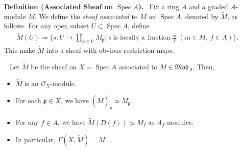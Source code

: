 \documentclass[11pt,a4paper,footinclude=true,headinclude=true]{scrbook} %
\DeclareMathOperator{\Spec}{Spec}
\newcommand{\OO}{\mathcal{O}}
\newcommand{\pp}{\mathfrak{p}}
\newcommand{\<}{\langle}
\newcommand{\>}{\rangle}
\newcommand{\MOD}{\mathfrak{Mod}}
\newenvironment{proposition}[2][]
{\renewcommand\theinnercustomprop{#2}\innercustomprop[#1] 
\begin{mdframed}[backgroundcolor=gray!20]\ }
{\end{mdframed}\endinnercustomprop}
\newenvironment{definition}[2][Definition]
    { \begin{mdframed}[backgroundcolor=gray!20] \textbf{#1 #2.}\ }
    {  \end{mdframed}}
\begin{document}
\begin{definition}{(Associated Sheaf on $\Spec A$)}
    Fix a ring $A$ and a graded $A$-module $M$. We define the \textit{sheaf associated} to $M$ on $\Spec A$, denoted by $\widetilde{M}$, as follows. For any open subset $U\subset\Spec A$, define
    \begin{align*}
        \widetilde{M}(U)\coloneqq\Big\{s:U\to\coprod_{\pp\in U}M_{\pp}\Big|\ s\ \text{is locally a fraction}\ \frac{m}{f}\ (m\in M,\ f\in A)\Big\}.
    \end{align*}
    This make $\widetilde{M}$ into a sheaf with obvious restriction maps.
\end{definition} 
    
\begin{proposition}{5.1}
    Let $\widetilde{M}$ be the sheaf on $X=\Spec A$ associated to $M\in \MOD_A$. Then,
    \begin{itemize}
        \item[(a)] $\widetilde{M}$ is an $\OO_X$-module.
        \item[(b)] For each $\pp\in X$, we have $(\widetilde{M})_\pp\simeq M_\pp$.
        \item[(c)] For any $f\in A$, we have $\widetilde{M}(D(f))\simeq M_f$ as $A_f$-modules.
        \item[(d)] In particular, $\Gamma(X,\widetilde{M})=M$.
    \end{itemize}
\end{proposition}
\end{document}
